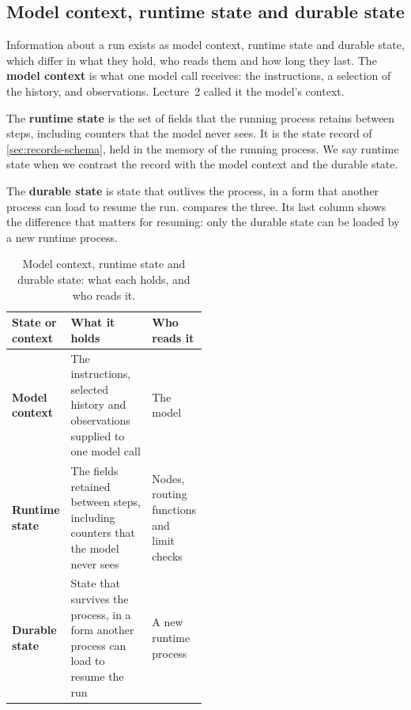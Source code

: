 \subsection{Model context, runtime state and durable state}
\label{sec:records-context}

Information about a run exists as model context, runtime state and durable state, which differ in
what they hold, who reads them and how long they last. The \textbf{model context} is what one model
call receives: the instructions, a selection of the history, and observations. Lecture~2 called it
the model's context.

The \textbf{runtime state} is the set of fields that the running process retains between steps,
including counters that the model never sees. It is the state record of \cref{sec:records-schema},
held in the memory of the running process. We say runtime state when we contrast the record with the
model context and the durable state.

The \textbf{durable state} is state that outlives the process, in a form that another process can
load to resume the run.  compares the three. Its last column shows the
difference that matters for resuming: only the durable state can be loaded by a new runtime process.

\begin{table}[htbp]
  \caption{Model context, runtime state and durable state: what each holds, and who reads it.}
  \label{tab:records-context}
  \begin{adjustbox}{width=\linewidth}\begin{tabularx}{\linewidth}{L{0.22\linewidth}XL{0.27\linewidth}}
    \toprule
    \textbf{State or context} & \textbf{What it holds} & \textbf{Who reads it} \\
    \midrule
    \textbf{Model context} & The instructions, selected history and observations supplied to one
    model call & The model \\
    \textbf{Runtime state} & The fields retained between steps, including counters that the model
    never sees & Nodes, routing functions and limit checks \\
    \textbf{Durable state} & State that survives the process, in a form another process can load to
    resume the run & A new runtime process \\
    \bottomrule
  \end{tabularx}\end{adjustbox}
\end{table}

